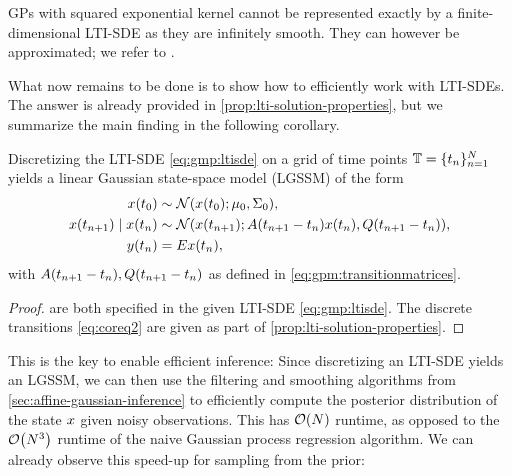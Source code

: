 \documentclass{mimosis}
\begin{document}
\begin{remark}
GPs with squared exponential kernel cannot be represented exactly by a finite-dimensional LTI-SDE as they are infinitely smooth.
They can however be approximated; we refer to
\textcite{sarkka2013spatiotemporal}.
\end{remark}

What now remains to be done is to show how to efficiently work with LTI-SDEs.
The answer is already provided in \cref{prop:lti-solution-properties}, but we summarize the main finding in the following corollary.

\begin{corollary}
\label{prop:ltisde-discretization}
Discretizing the LTI-SDE \cref{eq:gmp:ltisde}
on a grid of time points \(\mathbb{T} = \{t_n\}_{n=1}^N\)
yields a linear Gaussian state-space model (LGSSM) of the form
\begin{subequations}
\label{eq:gpm:ltisde-to-lgssm}
\begin{align}
\label{eq:coreq1}
\st(t_0) &\sim \N( \st(t_0); \mean{0}, \cov{0} ), \\
\label{eq:coreq2}
\st(t_{\idxt+1}) \mid \st(t_\idxt) &\sim \N( \st(t_{\idxt+1}); \transA(t_{\idxt+1}-t_\idxt) \st(t_\idxt), \transC(t_{\idxt+1}-t_\idxt) ), \\
\label{eq:coreq3}
\val(t_\idxt) &= \outA \st(t_\idxt),
\end{align}
\end{subequations}
with \(A(t_{n+1}-t_n), Q(t_{n+1}-t_n)\) as defined in \cref{eq:gpm:transitionmatrices}.
\end{corollary}

\begin{proof}
 are both specified in the given LTI-SDE \cref{eq:gmp:ltisde}.
The discrete transitions \cref{eq:coreq2} are given as part of
\cref{prop:lti-solution-properties}.
\end{proof}

This is the key to enable efficient inference:
Since discretizing an LTI-SDE yields an LGSSM, we can then use the filtering and smoothing algorithms from \cref{sec:affine-gaussian-inference} to efficiently compute the posterior distribution of the state \(x\) given noisy observations.
This has \(\order{N}\) runtime, as opposed to the \(\order{N^3}\) runtime of the naive Gaussian process regression algorithm.
We can already observe this speed-up for sampling from the prior:
\end{document}
